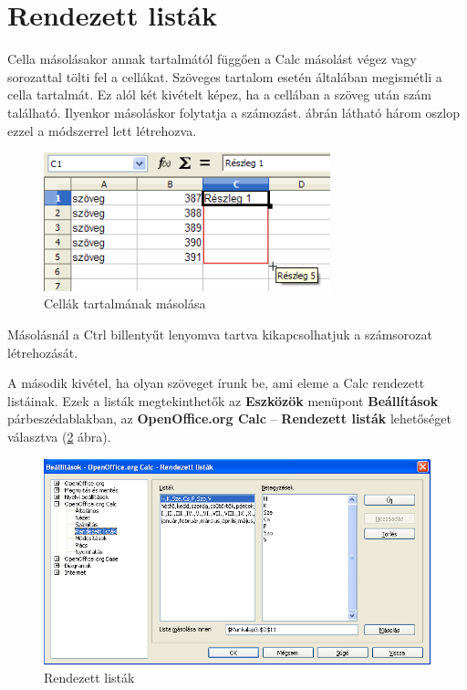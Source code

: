 \section{Rendezett listák }

Cella másolásakor annak tartalmától függően a Calc
másolást végez vagy sorozattal tölti fel a cellákat.
Szöveges tartalom esetén általában megismétli a cella
tartalmát. Ez alól két kivételt képez, ha a cellában a
szöveg után szám található. Ilyenkor másoláskor folytatja
a számozást.  ábrán látható három oszlop ezzel a
módszerrel lett létrehozva.

\begin{figure}[!h]
\begin{center}
\includegraphics[width=8.312cm]{oocalcv1-img107.png}
\caption{Cellák tartalmának másolása}\label{CellákMásolása}
\end{center}
\end{figure}

Másolásnál a Ctrl billentyűt lenyomva tartva kikapcsolhatjuk a
számsorozat létrehozását.

A második kivétel, ha olyan szöveget írunk be, ami eleme a Calc
rendezett listáinak. Ezek a listák megtekinthetők az
\textbf{Eszközök} menüpont \textbf{Beállítások}
párbeszédablakban, az \textbf{OpenOffice.org Calc} --
\textbf{Rendezett listák} lehetőséget választva (\ref{RendezettListák}
ábra).

\begin{figure}[!h]
\begin{center}
\includegraphics[width=14.999cm]{oocalcv1-img108.png}
\caption{Rendezett listák}\label{RendezettListák}
\end{center}
\end{figure}

